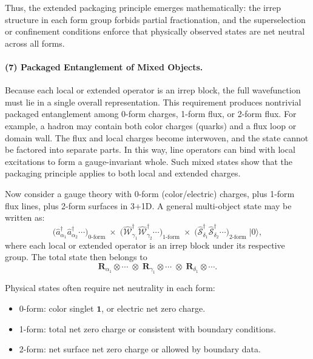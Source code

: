 \documentclass[12pt,a4paper]{article}
\begin{document}
Thus, the extended packaging principle emerges mathematically:
the irrep structure in each form group forbids partial fractionation, and the superselection or confinement conditions enforce that physically observed states are net neutral across all forms.


\paragraph{(7) Packaged Entanglement of Mixed Objects.}
Because each local or extended operator is an irrep block, the full wavefunction must lie in a single overall representation.
This requirement produces nontrivial packaged entanglement among 0-form charges, 1-form flux, or 2-form flux.
For example, a hadron may contain both color charges (quarks) and a flux loop or domain wall.
The flux and local charges become interwoven, and the state cannot be factored into separate parts.
In this way, line operators can bind with local excitations to form a gauge-invariant whole.
Such mixed states show that the packaging principle applies to both local and extended
charges.

Now consider a gauge theory with 0-form (color/electric) charges, plus 1-form flux lines, plus 2-form surfaces in 3+1D.
A general multi-object state may be written as:
\[
\bigl(\hat{a}^\dagger_{\alpha_1}\hat{a}^\dagger_{\alpha_2}\cdots\bigr)_{\text{0-form}}
\;\times\;
\bigl(\hat{\mathcal{W}}^\dagger_{\gamma_1}\hat{\mathcal{W}}^\dagger_{\gamma_2}\cdots\bigr)_{\text{1-form}}
\;\times\;
\bigl(\hat{\mathcal{S}}^\dagger_{\delta_1}\hat{\mathcal{S}}^\dagger_{\delta_2}\cdots\bigr)_{\text{2-form}}
\;\lvert 0\rangle,
\]
where each local or extended operator is an irrep block under its respective group.  
The total state then belongs to
\[
\mathbf{R}_{\alpha_1} \otimes \cdots \;\otimes\; \mathbf{R}_{\gamma_1}\otimes\cdots
\;\otimes\; \mathbf{R}_{\delta_1}\otimes \cdots.
\]

Physical states often require net neutrality in each form:
\begin{itemize}
	\item 0-form: color singlet $\mathbf{1}$, or electric net zero charge.  
	
	\item 1-form: total net zero charge or consistent with boundary conditions.  
	
	\item 2-form: net surface net zero charge or allowed by boundary data.
\end{itemize}
\end{document}
